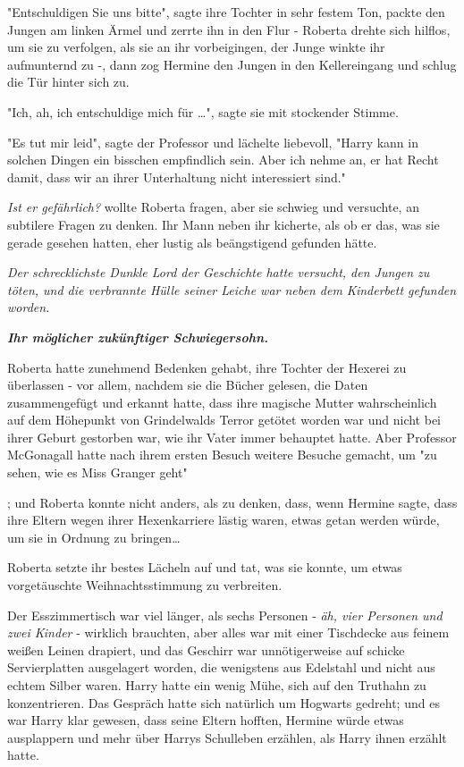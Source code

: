 {"Entschuldigen Sie uns bitte", sagte ihre Tochter in sehr festem Ton, packte den Jungen am linken Ärmel und zerrte ihn in den Flur - Roberta drehte sich hilflos, um sie zu verfolgen, als sie an ihr vorbeigingen, der Junge winkte ihr aufmunternd zu -, dann zog Hermine den Jungen in den Kellereingang und schlug die Tür hinter sich zu.

"Ich, ah, ich entschuldige mich für …", sagte sie mit stockender Stimme.

"Es tut mir leid", sagte der Professor und lächelte liebevoll, "Harry kann in solchen Dingen ein bisschen empfindlich sein. Aber ich nehme an, er hat Recht damit, dass wir an ihrer Unterhaltung nicht interessiert sind."

\emph{Ist er gefährlich?} wollte Roberta fragen, aber sie schwieg und versuchte, an subtilere Fragen zu denken. Ihr Mann neben ihr kicherte, als ob er das, was sie gerade gesehen hatten, eher lustig als beängstigend gefunden hätte.

\emph{Der schrecklichste Dunkle Lord der Geschichte hatte versucht, den Jungen zu töten, und die verbrannte Hülle seiner Leiche war neben dem Kinderbett gefunden worden.}

\textbf{\emph{Ihr möglicher zukünftiger Schwiegersohn.}}

Roberta hatte zunehmend Bedenken gehabt, ihre Tochter der Hexerei zu überlassen - vor allem, nachdem sie die Bücher gelesen, die Daten zusammengefügt und erkannt hatte, dass ihre magische Mutter wahrscheinlich auf dem Höhepunkt von Grindelwalds Terror getötet worden war und nicht bei ihrer Geburt gestorben war, wie ihr Vater immer behauptet hatte. Aber Professor McGonagall hatte nach ihrem ersten Besuch weitere Besuche gemacht, um "zu sehen, wie es Miss Granger geht"

; und Roberta konnte nicht anders, als zu denken, dass, wenn Hermine sagte, dass ihre Eltern wegen ihrer Hexenkarriere lästig waren, etwas getan werden würde, um sie in Ordnung zu bringen…

Roberta setzte ihr bestes Lächeln auf und tat, was sie konnte, um etwas vorgetäuschte Weihnachtsstimmung zu verbreiten.

Der Esszimmertisch war viel länger, als sechs Personen - \emph{äh, vier Personen und zwei Kinder} - wirklich brauchten, aber alles war mit einer Tischdecke aus feinem weißen Leinen drapiert, und das Geschirr war unnötigerweise auf schicke Servierplatten ausgelagert worden, die wenigstens aus Edelstahl und nicht aus echtem Silber waren. Harry hatte ein wenig Mühe, sich auf den Truthahn zu konzentrieren. Das Gespräch hatte sich natürlich um Hogwarts gedreht; und es war Harry klar gewesen, dass seine Eltern hofften, Hermine würde etwas ausplappern und mehr über Harrys Schulleben erzählen, als Harry ihnen erzählt hatte.

}
